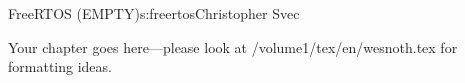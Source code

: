 \begin{aosachapter}{FreeRTOS (EMPTY)}{s:freertos}{Christopher Svec}

Your chapter goes here---please look at /volume1/tex/en/wesnoth.tex for 
formatting ideas.

\end{aosachapter}
